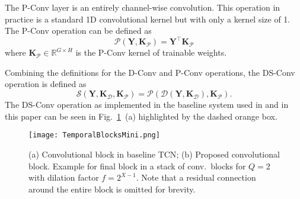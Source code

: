 \documentclass{article}
\newcommand{\vek}[1]{\ensuremath{\mathbf{#1}}}    \newcommand{\vekc}[1]{\ensuremath{\boldsymbol{\mathcal{#1}}}}
\begin{document}
The \ac{P-Conv} layer is an entirely channel-wise convolution. This operation in practice is a standard 1D convolutional kernel but with only a kernel size of 1. The \ac{P-Conv} operation can be defined as
\begin{equation}
    \mathcal{P}(\vek{Y},\mathbf{K}_{\mathcal{P}})=\vek{Y}^\top \vek{K}_{\mathcal{P}}
\end{equation}
where $\mathbf{K}_{\mathcal{P}}\in\mathbb{R}^{G\times H}$ is the \ac{P-Conv} kernel of trainable weights.

Combining the definitions for the \ac{D-Conv} and \ac{P-Conv} operations, the \ac{DS-Conv} operation is defined as
\begin{equation}
    \mathcal{S}\left(\vek{Y},\vek{K}_{\mathcal{D}},\mathbf{K}_{\mathcal{P}}\right)=\mathcal{P}\left(\mathcal{D}\left(\vek{Y},\vek{K}_{\mathcal{D}}\right),\mathbf{K}_{\mathcal{P}}\right).
\end{equation}
The \ac{DS-Conv} operation as implemented in the baseline system used in \cite{rfield} and in this paper can be seen in Fig.~\ref{fig:convblocks}~(a) highlighted by the dashed orange box.
\begin{figure}[!ht]
    \centering
    \texttt{[image: TemporalBlocksMini.png]} 
    \caption{(a) Convolutional block in baseline \ac{TCN}; (b) Proposed convolutional block. Example for final block in a stack of conv.~blocks for $Q=2$ with dilation factor $f=2^{X-1}$. Note that a residual connection around the entire block is omitted for brevity.}
    \label{fig:convblocks}
\end{figure}
\end{document}
